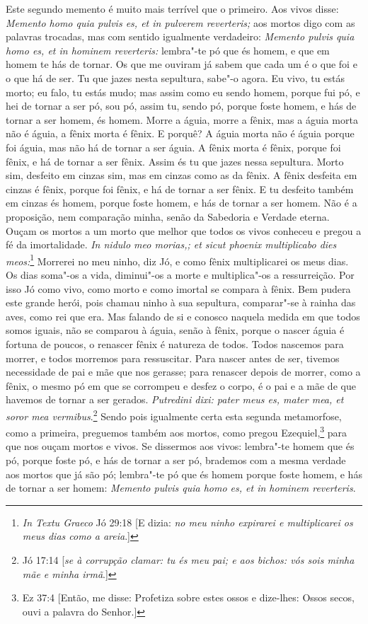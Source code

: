Este segundo memento é muito mais terrível que o primeiro. Aos
vivos disse: \emph{Memento homo quia pulvis es, et in pulverem
reverteris;} aos mortos digo com as palavras trocadas, mas com sentido
igualmente verdadeiro: \emph{Memento pulvis quia homo es, et in hominem
reverteris:} lembra"-te pó que és homem, e que em homem te hás de tornar.
Os que me ouviram já sabem que cada um é o que foi e o que há de ser. Tu
que jazes nesta sepultura, sabe"-o agora. Eu vivo, tu estás morto; eu
falo, tu estás mudo; mas assim como eu sendo homem, porque fui pó, e hei
de tornar a ser pó, sou pó, assim tu, sendo pó, porque foste homem, e
hás de tornar a ser homem, és homem. Morre a águia, morre a fênix, mas a
águia morta não é águia, a fênix morta é fênix. E porquê? A águia morta
não é águia porque foi águia, mas não há de tornar a ser águia. A fênix
morta é fênix, porque foi fênix, e há de tornar a ser fênix. Assim és tu
que jazes nessa sepultura. Morto sim, desfeito em cinzas sim, mas em
cinzas como as da fênix. A fênix desfeita em cinzas é fênix, porque foi
fênix, e há de tornar a ser fênix. E tu desfeito também em cinzas és
homem, porque foste homem, e hás de tornar a ser homem. Não é a
proposição, nem comparação minha, senão da Sabedoria e Verdade eterna.
Ouçam os mortos a um morto que melhor que todos os vivos conheceu e
pregou a fé da imortalidade. \emph{In nidulo meo morias,; et sicut
phoenix multiplicabo dies meos:}\footnote{\emph{In Textu Graeco} Jó 29:18 [E dizia: \emph{no meu ninho expirarei e multiplicarei os meus dias como a
areia}.]} Morrerei no meu ninho, diz Jó, e como
fênix multiplicarei os meus dias. Os dias soma"-os a vida, diminui"-os a
morte e multiplica"-os a ressurreição. Por isso Jó como vivo, como morto
e como imortal se compara à
fênix. Bem pudera este grande herói, pois chamau ninho à sua sepultura,
comparar"-se à rainha das aves, como rei que era. Mas falando de si e
conosco naquela medida em que todos somos iguais, não se comparou à
águia, senão à fênix, porque o nascer águia é fortuna de poucos, o
renascer fênix é natureza de todos. Todos nascemos para morrer, e todos
morremos para ressuscitar. Para nascer antes de ser, tivemos necessidade
de pai e mãe que nos gerasse; para renascer depois de morrer, como a
fênix, o mesmo pó em que se corrompeu e desfez o corpo, é o pai e a mãe
de que havemos de tornar a ser gerados. \emph{Putredini dixi: pater meus
es, mater mea, et soror mea vermibus}.\footnote{Jó 17:14 [\emph{se à corrupção clamar: tu és meu pai; e aos bichos: vós sois minha mãe e minha irmã}.]} Sendo pois igualmente certa
esta segunda metamorfose, como a primeira, preguemos também aos mortos,
como pregou Ezequiel,\footnote{Ez 37:4 [Então, me disse: Profetiza sobre estes ossos e dize-lhes: Ossos secos, ouvi a palavra do Senhor.]} para que nos ouçam mortos e vivos. Se
dissermos aos vivos: lembra"-te homem que és pó, porque foste pó, e hás
de tornar a ser pó, brademos com a mesma verdade aos mortos que já são
pó; lembra"-te pó que és homem porque foste homem, e hás de tornar a ser
homem: \emph{Memento pulvis quia homo es, et in hominem reverteris}.

